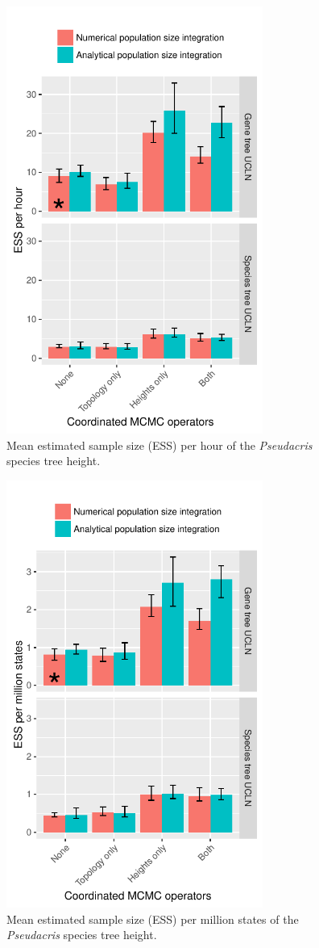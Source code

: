 \documentclass[12pt]{article}
\begin{document}
\begin{figure}[htb!]
\centering
\includegraphics[height=14cm]{speciesTreeHeight_ess_per_hour.pdf}
\caption
{Mean estimated sample size (ESS) per hour of the \textit{Pseudacris} species tree height.}
\label{fig:essPerHour}
\end{figure}

\clearpage

\begin{figure}[htb!]
\centering
\includegraphics[height=14cm]{speciesTreeHeight_ess_per_mstates.pdf}
\caption
{Mean estimated sample size (ESS) per million states of the \textit{Pseudacris} species tree height.}
\label{fig:essPerMstates}
\end{figure}
\end{document}
